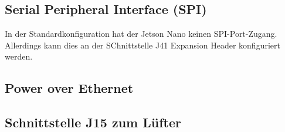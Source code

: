 \subsection{Serial Peripheral Interface (SPI)}

In der Standardkonfiguration hat der Jetson Nano keinen SPI-Port-Zugang. Allerdings kann dies an der SChnittstelle J41 Expansion Header konfiguriert werden.



\subsection{Power over Ethernet}

\subsection{Schnittstelle J15 zum Lüfter}


